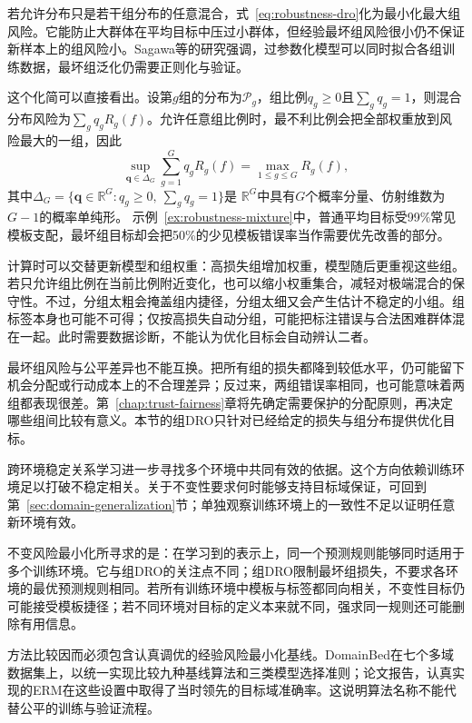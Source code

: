 若允许分布只是若干组分布的任意混合，式~\eqref{eq:robustness-dro}化为最小化最大组风险。它能防止大群体在平均目标中压过小群体，但经验最坏组风险很小仍不保证新样本上的组风险小。Sagawa等的研究强调，过参数化模型可以同时拟合各组训练数据，最坏组泛化仍需要正则化与验证。

这个化简可以直接看出。设第$g$组的分布为$\mathcal P_g$，组比例$q_g\geq0$且$\sum_gq_g=1$，则混合分布风险为$\sum_gq_gR_g(f)$。允许任意组比例时，最不利比例会把全部权重放到风险最大的一组，因此
\begin{equation}
 \sup_{\bm{q}\in\Delta_G}\sum_{g=1}^{G}q_gR_g(f)
       =\max_{1\leq g\leq G}R_g(f),
 \label{eq:robustness-group-dro}
\end{equation}
其中$\Delta_G=\{\bm q\in\mathbb R^G:q_g\geq0,\ \sum_gq_g=1\}$是
$\mathbb R^G$中具有$G$个概率分量、仿射维数为$G-1$的概率单纯形。
示例~\ref{ex:robustness-mixture}中，普通平均目标受99\%常见模板支配，最坏组目标却会把50\%的少见模板错误率当作需要优先改善的部分。

计算时可以交替更新模型和组权重：高损失组增加权重，模型随后更重视这些组。若只允许组比例在当前比例附近变化，也可以缩小权重集合，减轻对极端混合的保守性。不过，分组太粗会掩盖组内捷径，分组太细又会产生估计不稳定的小组。组标签本身也可能不可得；仅按高损失自动分组，可能把标注错误与合法困难群体混在一起。此时需要数据诊断，不能认为优化目标会自动辨认二者。

最坏组风险与公平差异也不能互换。把所有组的损失都降到较低水平，仍可能留下机会分配或行动成本上的不合理差异；反过来，两组错误率相同，也可能意味着两组都表现很差。第~\ref{chap:trust-fairness}章将先确定需要保护的分配原则，再决定哪些组间比较有意义。本节的组DRO只针对已经给定的损失与组分布提供优化目标。

跨环境稳定关系学习进一步寻找多个环境中共同有效的依据。这个方向依赖训练环境足以打破不稳定相关。关于不变性要求何时能够支持目标域保证，可回到第~\ref{sec:domain-generalization}节；单独观察训练环境上的一致性不足以证明任意新环境有效。

不变风险最小化所寻求的是：在学习到的表示上，同一个预测规则能够同时适用于多个训练环境。它与组DRO的关注点不同；组DRO限制最坏组损失，不要求各环境的最优预测规则相同。若所有训练环境中模板与标签都同向相关，不变性目标仍可能接受模板捷径；若不同环境对目标的定义本来就不同，强求同一规则还可能删除有用信息。

方法比较因而必须包含认真调优的经验风险最小化基线。DomainBed在七个多域数据集上，以统一实现比较九种基线算法和三类模型选择准则；论文报告，认真实现的ERM在这些设置中取得了当时领先的目标域准确率。这说明算法名称不能代替公平的训练与验证流程。

